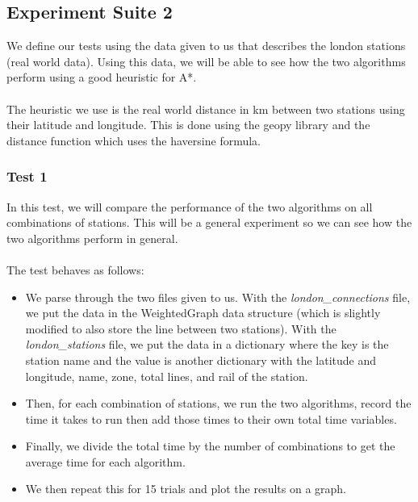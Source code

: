 \documentclass{article}
\begin{document}
\subsection{Experiment Suite 2}

We define our tests using the data given to us that describes the london stations (real world data). Using this data, we will be able to see how the two algorithms perform using a good heuristic for A*.\\
\\
The heuristic we use is the real world distance in km between two stations using their latitude and longitude. This is done using the geopy library and the distance function which uses the haversine formula.\\

\subsubsection{Test 1}

In this test, we will compare the performance of the two algorithms on all combinations of stations. This will be a general experiment so we can see how the two algorithms perform in general.\\
\\
The test behaves as follows: \\

\begin{itemize}
    \item We parse through the two files given to us. With the \emph{london\_connections} file, we put the data in the WeightedGraph data structure (which is slightly modified to also store the line between two stations). With the \emph{london\_stations} file, we put the data in a dictionary where the key is the station name and the value is another dictionary with the latitude and longitude, name, zone, total lines, and rail of the station. \\
    \item Then, for each combination of stations, we run the two algorithms, record the time it takes to run then add those times to their own total time variables.
    \item Finally, we divide the total time by the number of combinations to get the average time for each algorithm.
    \item We then repeat this for 15 trials and plot the results on a graph.
    
\end{itemize}
\end{document}
